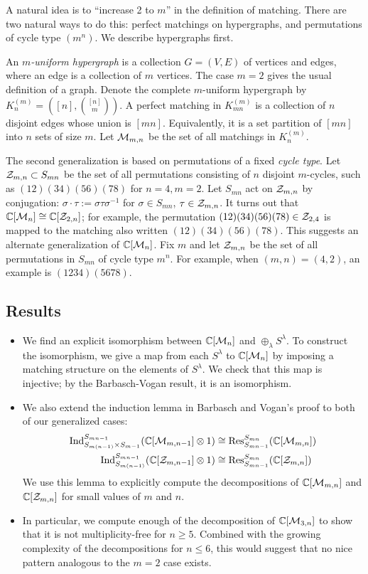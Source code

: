 A natural idea is to ``increase 2 to $m$'' in the definition of matching.
There are two natural ways to do this: perfect matchings on hypergraphs, and permutations of cycle type $(m^n)$. We describe hypergraphs first.

An {\em $m$-uniform hypergraph} is a collection $G = (V,E)$ of vertices and edges, where an edge is a collection of $m$ vertices.
The case $m=2$ gives the usual definition of a graph.
Denote the complete $m$-uniform hypergraph by $K^{(m)}_n = ([n],{{[n]} \choose m})$.
A perfect matching in $K^{(m)}_{mn}$ is a collection of $n$ disjoint edges whose union is $[mn]$.
Equivalently, it is a set partition of $[mn]$ into $n$ sets of size $m$.
Let $\mathcal{M}_{m,n}$ be the set of all matchings in $K^{(m)}_n$.

The second generalization is based on permutations of a fixed {\em cycle type}.
Let $\mathcal{Z}_{m,n} \subset S_{mn}$ be the set of all permutations consisting of $n$ disjoint $m$-cycles, such as $(12)(34)(56)(78)$ for $n=4,m=2$.
Let $S_{mn}$ act on $\mathcal{Z}_{m,n}$ by conjugation: $\sigma \cdot \tau := \sigma \tau \sigma^{-1}$ for $\sigma \in S_{mn}$, $\tau \in \mathcal{Z}_{m,n}$.
It turns out that $\mathbb{C}[\mathcal{M}_n] \cong \mathbb{C}[\mathcal{Z}_{2,n}]$; for example, the permutation $(12)(34)(56)(78) \in \mathcal{Z}_{2,4}$ is mapped to the matching also written $(12)(34)(56)(78)$.
This suggests an alternate generalization of $\mathbb{C}[\mathcal{M}_n]$.
Fix $m$ and let $\mathcal{Z}_{m,n}$ be the set of all permutations in $S_{mn}$ of cycle type $m^n$.
For example, when $(m,n) = (4,2)$, an example is $(1234)(5678)$.

\subsection{Results}
\begin{itemize}
\item We find an explicit isomorphism between $\mathbb{C}[\mathcal{M}_{n}]$ and $\oplus_\lambda S^\lambda$.
To construct the isomorphism, we give a map from each $S^\lambda$ to $\mathbb{C}[\mathcal{M}_{n}]$ by imposing a matching structure on the elements of $S^\lambda$.
We check that this map is injective; by the Barbasch-Vogan result, it is an isomorphism.
\item We also extend the induction lemma in Barbasch and Vogan's proof to both of our generalized cases:
\begin{align*}
 \textup{Ind}_{S_{m(n-1)} \times S_{m-1}}^{S_{mn-1}}(\mathbb{C}[\mathcal{M}_{m,n-1}] \otimes 1) & \cong \textup{Res}_{S_{mn-1}}^{S_{mn}}( \mathbb{C}[\mathcal{M}_{m,n}]) \\
 \textup{Ind}_{S_{m(n-1)} }^{S_{mn-1}}(\mathbb{C}[\mathcal{Z}_{m,n-1}] \otimes 1) & \cong \textup{Res}_{S_{mn-1}}^{S_{mn}}( \mathbb{C}[\mathcal{Z}_{m,n}])
\end{align*}
We use this lemma to explicitly compute the decompositions of $\mathbb{C}[\mathcal{M}_{m,n}]$ and $\mathbb{C}[\mathcal{Z}_{m,n}]$ for small values of $m$ and $n$.
\item In particular, we compute enough of the decomposition of $\mathbb{C}[\mathcal{M}_{3,n}]$ to show that it is not multiplicity-free for $n \ge 5$. Combined with the growing complexity of the decompositions for $n \le 6$, this would suggest that no nice pattern analogous to the $m=2$ case exists.
\end{itemize}

